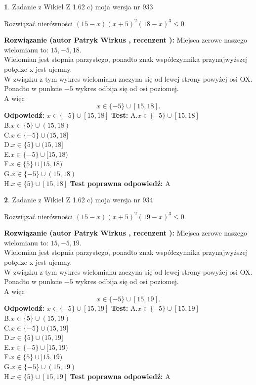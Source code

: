 \documentclass[12pt, a4paper]{article}
\theoremstyle{definition} %
\newtheorem{zad}{}
\newcommand{\zadStart}[1]{\begin{zad}#1\newline}
\newcommand{\zadStop}{\end{zad}}
\newcommand{\rozwStart}[2]{\noindent \textbf{Rozwiązanie (autor #1 , recenzent #2): }\newline}
\newcommand{\rozwStop}{\newline}
\newcommand{\odpStart}{\noindent \textbf{Odpowiedź:}\newline}
\newcommand{\odpStop}{\newline}
\newcommand{\testStart}{\noindent \textbf{Test:}\newline}
\newcommand{\testStop}{\newline}
\newcommand{\kluczStart}{\noindent \textbf{Test poprawna odpowiedź:}\newline}
\newcommand{\kluczStop}{\newline}
\begin{document}
\zadStart{Zadanie z Wikieł Z 1.62 c) moja wersja nr 933}

Rozwiązać nierówności $(15-x)(x+5)^{2}(18-x)^{3}\le0$.
\zadStop
\rozwStart{Patryk Wirkus}{}
Miejsca zerowe naszego wielomianu to: $15, -5, 18$.\\
Wielomian jest stopnia parzystego, ponadto znak współczynnika przy\linebreak najwyższej potędze x jest ujemny.\\ W związku z tym wykres wielomianu zaczyna się od lewej strony powyżej osi OX.\\
Ponadto w punkcie $-5$ wykres odbija się od osi poziomej.\\
A więc $$x \in \{-5\} \cup [15,18].$$
\rozwStop
\odpStart
$x \in \{-5\} \cup [15,18]$
\odpStop
\testStart
A.$x \in \{-5\} \cup [15,18]$\\
B.$x \in \{5\} \cup (15,18)$\\
C.$x \in \{-5\} \cup (15,18]$\\
D.$x \in \{5\} \cup (15,18]$\\
E.$x \in \{-5\} \cup [15,18)$\\
F.$x \in \{5\} \cup [15,18)$\\
G.$x \in \{-5\} \cup (15,18)$\\
H.$x \in \{5\} \cup [15,18]$
\testStop
\kluczStart
A
\kluczStop



\zadStart{Zadanie z Wikieł Z 1.62 c) moja wersja nr 934}

Rozwiązać nierówności $(15-x)(x+5)^{2}(19-x)^{3}\le0$.
\zadStop
\rozwStart{Patryk Wirkus}{}
Miejsca zerowe naszego wielomianu to: $15, -5, 19$.\\
Wielomian jest stopnia parzystego, ponadto znak współczynnika przy\linebreak najwyższej potędze x jest ujemny.\\ W związku z tym wykres wielomianu zaczyna się od lewej strony powyżej osi OX.\\
Ponadto w punkcie $-5$ wykres odbija się od osi poziomej.\\
A więc $$x \in \{-5\} \cup [15,19].$$
\rozwStop
\odpStart
$x \in \{-5\} \cup [15,19]$
\odpStop
\testStart
A.$x \in \{-5\} \cup [15,19]$\\
B.$x \in \{5\} \cup (15,19)$\\
C.$x \in \{-5\} \cup (15,19]$\\
D.$x \in \{5\} \cup (15,19]$\\
E.$x \in \{-5\} \cup [15,19)$\\
F.$x \in \{5\} \cup [15,19)$\\
G.$x \in \{-5\} \cup (15,19)$\\
H.$x \in \{5\} \cup [15,19]$
\testStop
\kluczStart
A
\kluczStop
\end{document}
